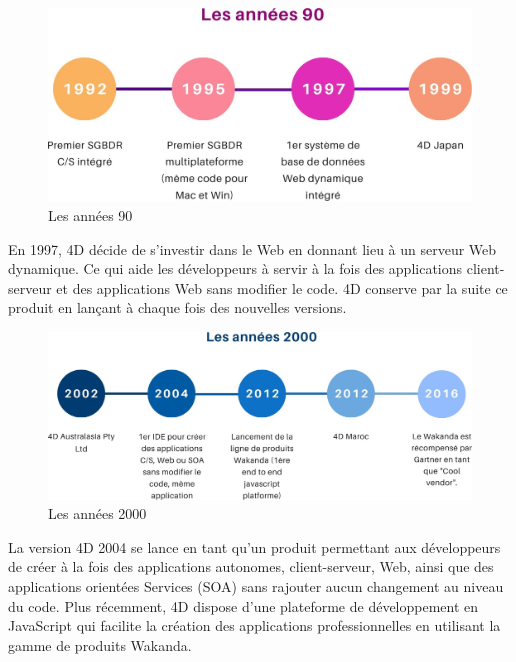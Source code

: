 \begin{figure}[h]
    \centering
    \includegraphics[scale=0.3]{Figures/90.jpg} %
    \caption{Les années 90}
    \label{fig:Histoire90}
\end{figure}

En 1997, 4D décide de s’investir dans le Web en donnant lieu 
à un serveur Web dynamique. Ce qui aide les développeurs à servir
à la fois des applications client-serveur et des applications
Web sans modifier le code. 4D conserve par la suite ce produit 
en lançant à chaque fois des nouvelles versions.

\begin{figure}[h]
    \centering
    \includegraphics[scale=0.3]{Figures/20.jpg} %
    \caption{Les années 2000}
    \label{fig:Histoire90}
\end{figure}

La version 4D 2004 se lance en tant qu’un produit permettant aux développeurs 
de créer à la fois des applications autonomes, client-serveur, Web, 
ainsi que des applications orientées Services (SOA) sans rajouter 
aucun changement au niveau du code.
Plus récemment, 4D dispose d’une plateforme de développement 
en JavaScript qui facilite la création des applications 
professionnelles en utilisant la gamme de produits Wakanda.


